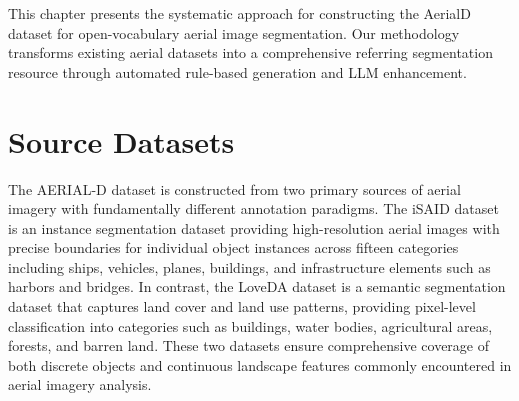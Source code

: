 \cleardoublepage
\label{chap:implement}

This chapter presents the systematic approach for constructing the AerialD dataset for open-vocabulary aerial image segmentation. Our methodology transforms existing aerial datasets into a comprehensive referring segmentation resource through automated rule-based generation and LLM enhancement.

\section{Source Datasets}

\noindent The AERIAL-D dataset is constructed from two primary sources of aerial imagery with fundamentally different annotation paradigms. The iSAID dataset is an instance segmentation dataset providing high-resolution aerial images with precise boundaries for individual object instances across fifteen categories including ships, vehicles, planes, buildings, and infrastructure elements such as harbors and bridges. In contrast, the LoveDA dataset is a semantic segmentation dataset that captures land cover and land use patterns, providing pixel-level classification into categories such as buildings, water bodies, agricultural areas, forests, and barren land. These two datasets ensure comprehensive coverage of both discrete objects and continuous landscape features commonly encountered in aerial imagery analysis.


